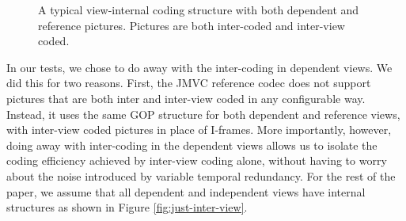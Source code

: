 \documentclass{sig-alternate-05-2015}
\begin{document}
\begin{figure}[H]
\begin{center}
\end{center}
\caption{
A typical view-internal coding structure with both dependent and reference
pictures. Pictures are both inter-coded and inter-view coded.
}
\label{fig:inter-view}
\end{figure}

In our tests, we chose to do away with the inter-coding in dependent views. We
did this for two reasons. First, the JMVC reference codec does not support
pictures that are both inter and inter-view coded in any configurable way.
Instead, it uses the same GOP structure for both dependent and reference views,
with inter-view coded pictures in place of I-frames. More importantly, however,
doing away with inter-coding in the dependent views allows us to isolate the
coding efficiency achieved by inter-view coding alone, without having to worry
about the noise introduced by variable temporal redundancy. For the rest of the
paper, we assume that all dependent and independent views have internal
structures as shown in Figure \ref{fig:just-inter-view}.
\end{document}
